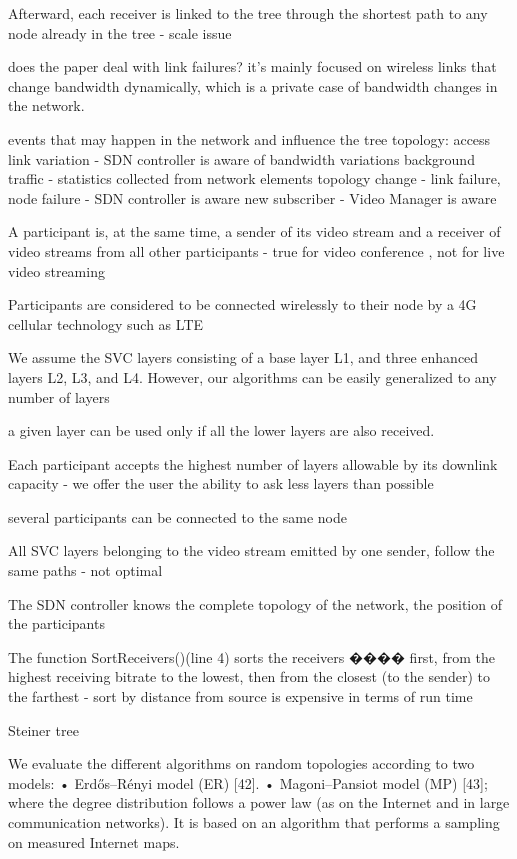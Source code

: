 \documentclass[a4paper, 10pt, conference]{ieeeconf}
\begin{document}
Afterward, each receiver is linked to the tree through the
shortest path to any node already in the tree - scale issue

does the paper deal with link failures?
it's mainly focused on wireless links that change bandwidth dynamically, which is a private case of bandwidth changes in the network.

events that may happen in the network and influence the tree topology:
access link variation - SDN controller is aware of bandwidth variations
background traffic - statistics collected from network elements
topology change - link failure, node failure - SDN controller is aware
new subscriber - Video Manager is aware

A participant is, at the same time, a sender of its video
stream and a receiver of video streams from all other participants - true for video conference , not for live video streaming

Participants are considered to be connected wirelessly to their
node by a 4G cellular technology such as LTE

We assume the SVC layers consisting of a base layer L1, and three enhanced
layers L2, L3, and L4. However, our algorithms can be easily generalized
to any number of layers

a given layer can be used only
if all the lower layers are also received.

Each participant accepts the
highest number of layers allowable by its downlink capacity - we offer the user the ability to ask less layers than possible

several participants can be connected to the same
node

All SVC layers belonging to the video stream emitted by one
sender, follow the same paths - not optimal

The SDN controller knows the complete topology of the network,
the position of the participants

The function SortReceivers()(line 4) sorts the
receivers ���� first, from the highest receiving bitrate to the lowest, then
from the closest (to the sender) to the farthest - sort by distance from source is expensive in terms of run time

Steiner tree \cite{winter1987steiner}

We evaluate the different algorithms on random topologies according
to two models:
• Erdős–Rényi model (ER) [42].
• Magoni–Pansiot model (MP) [43]; where the degree distribution
follows a power law (as on the Internet and in large communication
networks). It is based on an algorithm that performs a
sampling on measured Internet maps.
\end{document}
